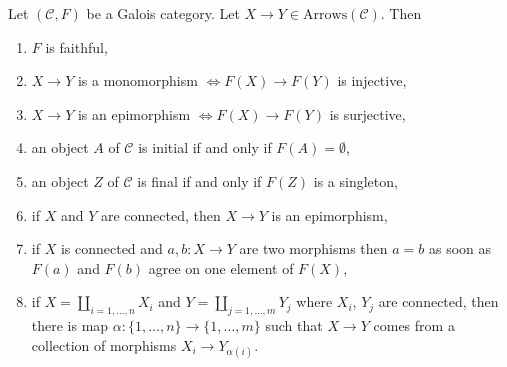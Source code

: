 \begin{lemma}
\label{lemma-epi-mono}
Let $(\mathcal{C}, F)$ be a Galois category. Let
$X \to Y \in \text{Arrows}(\mathcal{C})$. Then
\begin{enumerate}
\item $F$ is faithful,
\item $X \to Y$ is a monomorphism
$\Leftrightarrow F(X) \to F(Y)$ is injective,
\item $X \to Y$ is an epimorphism
$\Leftrightarrow F(X) \to F(Y)$ is surjective,
\item an object $A$ of $\mathcal{C}$ is initial if and only if
$F(A) = \emptyset$,
\item an object $Z$ of $\mathcal{C}$ is final if and only if
$F(Z)$ is a singleton,
\item if $X$ and $Y$ are connected, then $X \to Y$ is an epimorphism,
\item
\label{item-one-element}
if $X$ is connected and $a, b : X \to Y$ are two morphisms
then $a = b$ as soon as $F(a)$ and $F(b)$ agree on one element of $F(X)$,
\item if $X = \coprod_{i = 1, \ldots, n} X_i$ and
$Y = \coprod_{j = 1, \ldots, m} Y_j$ where $X_i$, $Y_j$ are connected,
then there is map $\alpha : \{1, \ldots, n\} \to \{1, \ldots, m\}$
such that $X \to Y$ comes from a collection of morphisms
$X_i \to Y_{\alpha(i)}$.
\end{enumerate}
\end{lemma}

